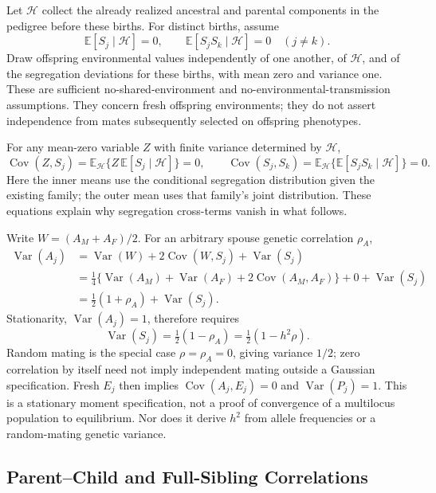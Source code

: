 Let $\mathcal H$ collect the already realized ancestral and parental
components in the pedigree before these births. For distinct births,
assume
\[
 \mathbb E[S_j\mid\mathcal H]=0,\qquad
 \mathbb E[S_jS_k\mid\mathcal H]=0\quad(j\ne k).
\]
Draw offspring environmental values independently of one another,
of $\mathcal H$, and of the segregation deviations for these births,
with mean zero and variance one. These are sufficient
no-shared-environment and no-environmental-transmission assumptions.
They concern fresh offspring environments; they do not assert
independence from mates subsequently selected on offspring phenotypes.

For any mean-zero variable $Z$ with finite variance determined by $\mathcal H$,
\[
 \operatorname{Cov}(Z,S_j)
 =\mathbb E_{\mathcal H}\{Z\,\mathbb E[S_j\mid\mathcal H]\}=0,\qquad
 \operatorname{Cov}(S_j,S_k)
 =\mathbb E_{\mathcal H}\{\mathbb E[S_jS_k\mid\mathcal H]\}=0.
\]
Here the inner means use the conditional segregation distribution given
the existing family; the outer mean uses that family's joint
distribution. These equations explain why segregation cross-terms
vanish in what follows.

Write $W=(A_M+A_F)/2$. For an arbitrary spouse genetic correlation
$\rho_A$,
\begin{align*}
 \operatorname{Var}(A_j)
 &=\operatorname{Var}(W)+2\operatorname{Cov}(W,S_j)
   +\operatorname{Var}(S_j)\\
 &=\tfrac14\{\operatorname{Var}(A_M)+\operatorname{Var}(A_F)
              +2\operatorname{Cov}(A_M,A_F)\}
   +0+\operatorname{Var}(S_j)\\
 &=\tfrac12(1+\rho_A)+\operatorname{Var}(S_j).
\end{align*}
Stationarity, $\operatorname{Var}(A_j)=1$, therefore requires
\begin{equation}
 \boxed{\operatorname{Var}(S_j)=\tfrac12(1-\rho_A)
          =\tfrac12(1-h^2\rho).}
 \label{eq:model-segregation}
\end{equation}
Random mating is the special case $\rho=\rho_A=0$, giving variance
$1/2$; zero correlation by itself need not imply independent mating
outside a Gaussian specification. Fresh $E_j$ then implies
$\operatorname{Cov}(A_j,E_j)=0$ and $\operatorname{Var}(P_j)=1$.
This is a stationary moment specification, not a proof of convergence
of a multilocus population to equilibrium. Nor does it derive $h^2$
from allele frequencies or a random-mating genetic variance.

\subsection{Parent--Child and Full-Sibling Correlations}
\label{sec:model-nuclear}

